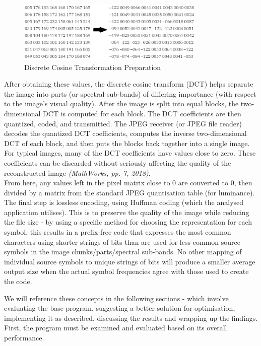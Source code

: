 \documentclass[12pt, a4paper]{article}
\begin{document}
\begin{figure}[H]
	\centering
		\includegraphics[width=0.8\textwidth]{"dcttransform"}
		\caption{Discrete Cosine Transformation Preparation}
\end{figure}

After obtaining these values, the discrete cosine transform (DCT) helps separate the image into parts (or spectral sub-bands) of differing importance (with respect to the image's visual quality). After the image is split into equal blocks, the two-dimensional DCT is computed for each block. The DCT coefficients are then quantized, coded, and transmitted. The JPEG receiver (or JPEG file reader) decodes the quantized DCT coefficients, computes the inverse two-dimensional DCT of each block, and then puts the blocks back together into a single image. For typical images, many of the DCT coefficients have values close to zero. These coefficients can be discarded without seriously affecting the quality of the reconstructed image \textit{(MathWorks, pp. 7, 2018)}. \\
From here, any values left in the pixel matrix close to 0 are converted to 0, then divided by a matrix from the standard JPEG quantisation table (for luminance). \\
The final step is lossless encoding, using Huffman coding (which the analysed application utilises). This is to preserve the quality of the image while reducing the file size - by using a specific method for choosing the representation for each symbol, this results in a prefix-free code that expresses the most common characters using shorter strings of bits than are used for less common source symbols in the image chunks/parts/spectral sub-bands. No other mapping of individual source symbols to unique strings of bits will produce a smaller average output size when the actual symbol frequencies agree with those used to create the code.

We will reference these concepts in the following sections - which involve evaluating the base program, suggesting a better solution for optimisation, implementing it as described, discussing the results and wrapping up the findings. First, the program must be examined and evaluated based on its overall performance.
\end{document}
